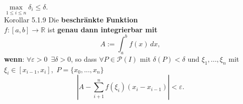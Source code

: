 \documentclass[landscape, 10pt]{article}
\newcommand{\R}{\mathbb{R}}
\begin{document}
\begin{multicols}{3}
                     \textcolor{NavyBlue}{
                     $\max\limits_{1\leqslant i
                     \leqslant n}\delta_i
                     \leqslant\delta$}. \\
              \colorbox{BurntOrange}{Korollar 5.1.9} 
                     Die \textbf{beschränkte Funktion} \\
                     \textcolor{NavyBlue}{
                     $f:[a,b]\longrightarrow\R$} ist 
                     \textbf{genau dann integrierbar mit}
                     \begin{equation*}
                            A:=\int_a^bf(x)\,dx,
                     \end{equation*}
                     \textbf{wenn}: 
                     \textcolor{NavyBlue}{
                     $\forall\varepsilon>0\enspace
                     \exists\delta>0$}, so dass 
                     \textcolor{NavyBlue}{
                     $\forall P\in\mathcal{P}(I)$} mit 
                     \textcolor{NavyBlue}{$\delta(P)<\delta$}
                     und \textcolor{NavyBlue}{
                     $\xi_1,...,\xi_n$} mit 
                     \textcolor{NavyBlue}{
                     $\xi_i\in[x_{i-1},x_i]$},\,
                     \textcolor{NavyBlue}{$P=\{x_0,...,x_n\}$} 
                     \begin{equation*}
                            |A-\sum_{i+1}^nf(\xi_i)
                            (x_i-x_{i-1})|
                            <\varepsilon.
                     \end{equation*}

\end{multicols}
\end{document}
